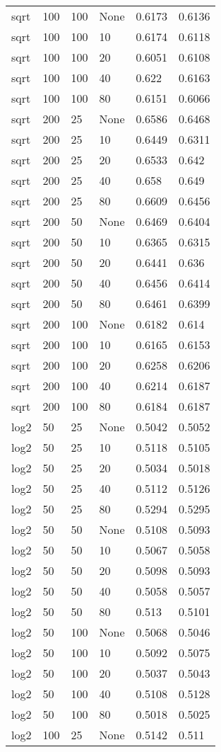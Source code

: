 \documentclass{article}%
\begin{document}
\begin{longtable}{l l l l l l}
sqrt&100&100&None&0.6173&0.6136\\%
sqrt&100&100&10&0.6174&0.6118\\%
sqrt&100&100&20&0.6051&0.6108\\%
sqrt&100&100&40&0.622&0.6163\\%
sqrt&100&100&80&0.6151&0.6066\\%
sqrt&200&25&None&0.6586&0.6468\\%
sqrt&200&25&10&0.6449&0.6311\\%
sqrt&200&25&20&0.6533&0.642\\%
sqrt&200&25&40&0.658&0.649\\%
sqrt&200&25&80&0.6609&0.6456\\%
sqrt&200&50&None&0.6469&0.6404\\%
sqrt&200&50&10&0.6365&0.6315\\%
sqrt&200&50&20&0.6441&0.636\\%
sqrt&200&50&40&0.6456&0.6414\\%
sqrt&200&50&80&0.6461&0.6399\\%
sqrt&200&100&None&0.6182&0.614\\%
sqrt&200&100&10&0.6165&0.6153\\%
sqrt&200&100&20&0.6258&0.6206\\%
sqrt&200&100&40&0.6214&0.6187\\%
sqrt&200&100&80&0.6184&0.6187\\%
log2&50&25&None&0.5042&0.5052\\%
log2&50&25&10&0.5118&0.5105\\%
log2&50&25&20&0.5034&0.5018\\%
log2&50&25&40&0.5112&0.5126\\%
log2&50&25&80&0.5294&0.5295\\%
log2&50&50&None&0.5108&0.5093\\%
log2&50&50&10&0.5067&0.5058\\%
log2&50&50&20&0.5098&0.5093\\%
log2&50&50&40&0.5058&0.5057\\%
log2&50&50&80&0.513&0.5101\\%
log2&50&100&None&0.5068&0.5046\\%
log2&50&100&10&0.5092&0.5075\\%
log2&50&100&20&0.5037&0.5043\\%
log2&50&100&40&0.5108&0.5128\\%
log2&50&100&80&0.5018&0.5025\\%
log2&100&25&None&0.5142&0.511\\%

\end{longtable}
\end{document}
